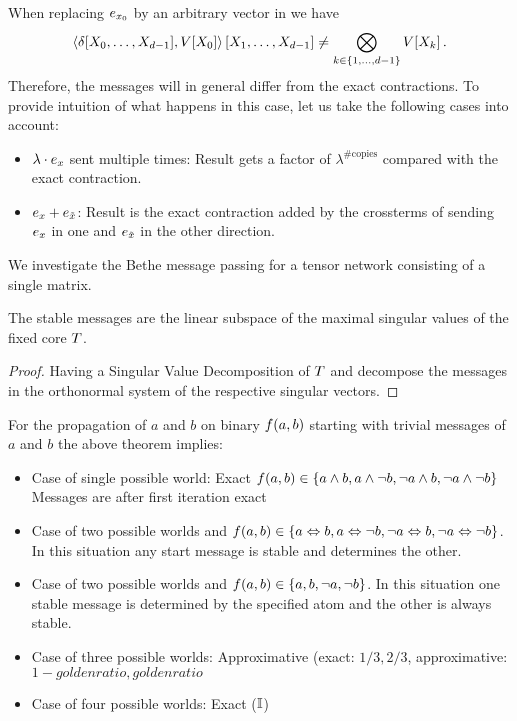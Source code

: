 When replacing $e_{x_{0}}$ by an arbitrary vector in  we have
	\[ \left\langle \delta[X_{0},\ldots,X_{d-1}], V[X_{0}]\right\rangle \left[ X_{1},\ldots,X_{d-1} \right] 
		\neq \bigotimes_{k\in\{1,\ldots,d-1\}} V[{X_{k}}]  \, . \]
Therefore, the messages will in general differ from the exact contractions.
To provide intuition of what happens in this case, let us take the following cases into account:
\begin{itemize}
	\item $\lambda\cdot e_{x}$ sent multiple times: Result gets a factor of $\lambda^{\# \text{copies}}$ compared with the exact contraction.
	\item $e_{x}+e_{\tilde{x}}$: Result is the exact contraction added by the crossterms of sending $e_{x}$ in one and $e_{\tilde{x}}$ in the other direction.
\end{itemize}	





We investigate the Bethe message passing for a tensor network consisting of a single matrix.

\begin{theorem}
	The stable messages are the linear subspace of the maximal singular values of the fixed core $T$.
\end{theorem}
\begin{proof}
	Having a Singular Value Decomposition of $T$ and decompose the messages in the orthonormal system of the respective singular vectors.
\end{proof}


For the propagation of $a$ and $b$ on binary $f(a, b)$ starting with trivial messages of $a$ and $b$ the above theorem implies:
\begin{itemize}
	\item Case of single possible world: Exact 
		$f(a, b) \in \{ a \land b, a \land \lnot b, \lnot a \land b, \lnot a \land \lnot b \}$
		Messages are after first iteration exact
	\item Case of two possible worlds and $f(a, b) \in \{ a \Leftrightarrow b, a \Leftrightarrow \lnot b, \lnot a \Leftrightarrow b, \lnot a \Leftrightarrow \lnot b \}$. 
		In this situation any start message is stable and determines the other.
	\item Case of two possible worlds and $f(a, b) \in \{ a, b, \lnot a, \lnot b\}$.
		In this situation one stable message is determined by the specified atom and the other is always stable.
	\item Case of  three possible worlds: Approximative (exact: $1/3, 2/3$, approximative: $1-golden ratio, golden ratio$
	\item Case of four possible worlds: Exact ($\mathbb{I}$) 
\end{itemize}


